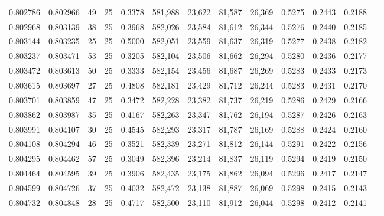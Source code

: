 \begin{tabular}{rrrrrrrrrrrrr}
0.802786 & 0.802966 &    49 &  25 &                                     0.3378 & 581,988 &  23,622 &  81,587 &  26,369 & 0.5275 & 0.2443 & 0.2188 \\
0.802968 & 0.803139 &    38 &  25 &                                     0.3968 & 582,026 &  23,584 &  81,612 &  26,344 & 0.5276 & 0.2440 & 0.2185 \\
0.803144 & 0.803235 &    25 &  25 &                                     0.5000 & 582,051 &  23,559 &  81,637 &  26,319 & 0.5277 & 0.2438 & 0.2182 \\
0.803237 & 0.803471 &    53 &  25 &                                     0.3205 & 582,104 &  23,506 &  81,662 &  26,294 & 0.5280 & 0.2436 & 0.2177 \\
0.803472 & 0.803613 &    50 &  25 &                                     0.3333 & 582,154 &  23,456 &  81,687 &  26,269 & 0.5283 & 0.2433 & 0.2173 \\
0.803615 & 0.803697 &    27 &  25 &                                     0.4808 & 582,181 &  23,429 &  81,712 &  26,244 & 0.5283 & 0.2431 & 0.2170 \\
0.803701 & 0.803859 &    47 &  25 &                                     0.3472 & 582,228 &  23,382 &  81,737 &  26,219 & 0.5286 & 0.2429 & 0.2166 \\
0.803862 & 0.803987 &    35 &  25 &                                     0.4167 & 582,263 &  23,347 &  81,762 &  26,194 & 0.5287 & 0.2426 & 0.2163 \\
0.803991 & 0.804107 &    30 &  25 &                                     0.4545 & 582,293 &  23,317 &  81,787 &  26,169 & 0.5288 & 0.2424 & 0.2160 \\
0.804108 & 0.804294 &    46 &  25 &                                     0.3521 & 582,339 &  23,271 &  81,812 &  26,144 & 0.5291 & 0.2422 & 0.2156 \\
0.804295 & 0.804462 &    57 &  25 &                                     0.3049 & 582,396 &  23,214 &  81,837 &  26,119 & 0.5294 & 0.2419 & 0.2150 \\
0.804464 & 0.804595 &    39 &  25 &                                     0.3906 & 582,435 &  23,175 &  81,862 &  26,094 & 0.5296 & 0.2417 & 0.2147 \\
0.804599 & 0.804726 &    37 &  25 &                                     0.4032 & 582,472 &  23,138 &  81,887 &  26,069 & 0.5298 & 0.2415 & 0.2143 \\
0.804732 & 0.804848 &    28 &  25 &                                     0.4717 & 582,500 &  23,110 &  81,912 &  26,044 & 0.5298 & 0.2412 & 0.2141 \\

\end{tabular}
